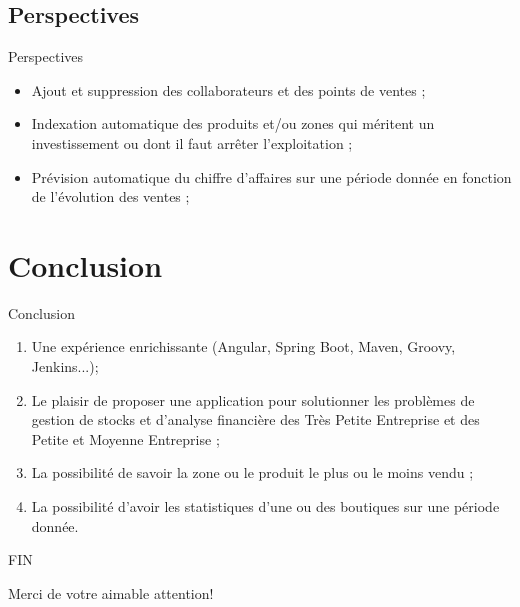 \documentclass[xcolor=dvipsnames]{beamer}
\begin{document}
  \subsection{Perspectives}
  \begin{frame}{Perspectives}
  \begin{itemize}
  \item Ajout et suppression des collaborateurs et des points de ventes ;
  \pause
  \item Indexation automatique des produits et/ou zones qui méritent un investissement ou dont il faut arrêter l'exploitation ;
  \pause
  \item Prévision automatique du chiffre d'affaires sur une période donnée en fonction de l'évolution des ventes ;
  \end{itemize}
  \end{frame}
    
  \section{Conclusion }
  \begin{frame}{Conclusion}
  \begin{enumerate}
  \item Une expérience enrichissante (Angular, Spring Boot, Maven, Groovy, Jenkins...);
  \pause
  \item Le plaisir de proposer une application pour solutionner les problèmes de gestion de stocks et d'analyse financière des Très Petite Entreprise et des Petite et Moyenne Entreprise ;
  \pause
  \item La possibilité de savoir la zone ou le produit le plus ou le moins vendu ;
  \pause
  \item La possibilité d'avoir les statistiques d'une ou des boutiques sur une période donnée.
  \end{enumerate}
  \end{frame}


  \begin{frame}{FIN}
  \begin{center}
    Merci de votre aimable attention!
  \end{center}
  \end{frame}   

\end{document}
